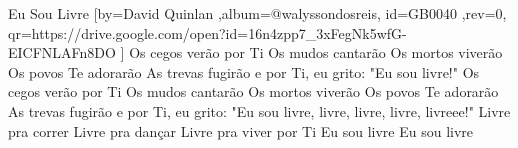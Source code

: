 \beginsong
{Eu Sou Livre %
}[by={David Quinlan %
},album={@walyssondosreis},
id={GB0040 %
},rev={0}, %
qr={https://drive.google.com/open?id=16n4zpp7_3xFegNk5wfG-EICFNLAFn8DO %
}]
\beginverse*
Os cegos verão por Ti
Os mudos cantarão
Os mortos viverão
Os povos Te adorarão
As trevas fugirão
e por Ti, eu grito:
"Eu sou livre!"
\endverse
\beginverse*
Os cegos verão por Ti
Os mudos cantarão
Os mortos viverão
Os povos Te adorarão
As trevas fugirão
e por Ti, eu grito:
"Eu sou livre, livre, livre, livre, livreee!"
\endverse
\beginchorus
Livre pra correr
Livre pra dançar
Livre pra viver por Ti
Eu sou livre
Eu sou livre
\endchorus

